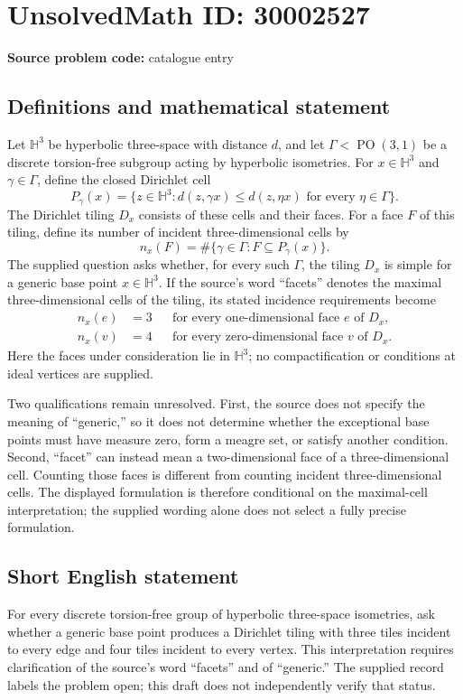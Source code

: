 \documentclass[11pt]{article}
\begin{document}
\section*{UnsolvedMath ID: 30002527}
\textbf{Source problem code:} catalogue entry
\subsection{Definitions and mathematical statement}
Let \(\mathbb H^3\) be hyperbolic three-space with distance \(d\), and let \(\Gamma<\operatorname{PO}(3,1)\) be a discrete torsion-free subgroup acting by hyperbolic isometries. For \(x\in\mathbb H^3\) and \(\gamma\in\Gamma\), define the closed Dirichlet cell
\[
P_\gamma(x)=\{z\in\mathbb H^3:d(z,\gamma x)\le d(z,\eta x)\text{ for every }\eta\in\Gamma\}.
\]
The Dirichlet tiling \(D_x\) consists of these cells and their faces. For a face \(F\) of this tiling, define its number of incident three-dimensional cells by
\[
n_x(F)=\#\{\gamma\in\Gamma:F\subseteq P_\gamma(x)\}.
\]
The supplied question asks whether, for every such \(\Gamma\), the tiling \(D_x\) is simple for a generic base point \(x\in\mathbb H^3\). If the source's word ``facets'' denotes the maximal three-dimensional cells of the tiling, its stated incidence requirements become
\[
\begin{aligned}
n_x(e)&=3 &&\text{for every one-dimensional face }e\text{ of }D_x,\\
n_x(v)&=4 &&\text{for every zero-dimensional face }v\text{ of }D_x.
\end{aligned}
\]
Here the faces under consideration lie in \(\mathbb H^3\); no compactification or conditions at ideal vertices are supplied.

Two qualifications remain unresolved. First, the source does not specify the meaning of ``generic,'' so it does not determine whether the exceptional base points must have measure zero, form a meagre set, or satisfy another condition. Second, ``facet'' can instead mean a two-dimensional face of a three-dimensional cell. Counting those faces is different from counting incident three-dimensional cells. The displayed formulation is therefore conditional on the maximal-cell interpretation; the supplied wording alone does not select a fully precise formulation.
\subsection{Short English statement}
For every discrete torsion-free group of hyperbolic three-space isometries, ask whether a generic base point produces a Dirichlet tiling with three tiles incident to every edge and four tiles incident to every vertex. This interpretation requires clarification of the source's word ``facets'' and of ``generic.'' The supplied record labels the problem open; this draft does not independently verify that status.
\end{document}
